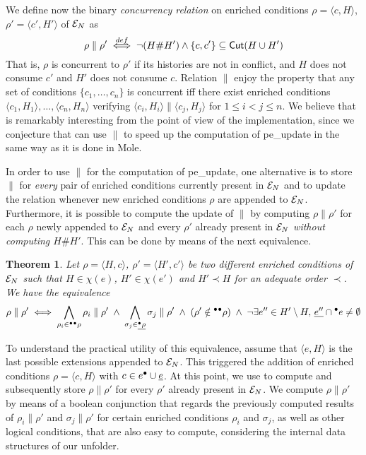 \documentclass[11pt,a4paper]{article}
\newtheorem{theorem}{Theorem}
\newcommand{\confl}{\ensuremath{\mathord{\#}}}
\newcommand{\peupdate}{\mbox{\sf pe\_update}}
\begin{document}
We define now the binary \emph{concurrency relation} on enriched conditions
$\rho = \langle c, H \rangle$, $\rho' = \langle c', H' \rangle$ of $\mathcal{E}_{N}$ as
$$ \rho \parallel \rho' \bydef\iff \lnot (H \confl H') \land \{c, c'\}
\subseteq \cut{H \cup H'}$$  That is, $\rho$ is concurrent to $\rho'$ if its
histories are not in conflict, and $H$ does not consume $c'$ and $H'$ does not
consume $c$.  Relation $\parallel$ enjoy the property that any set of
conditions $\{c_1, \ldots, c_n\}$ is concurrent iff there exist enriched
conditions $\langle c_1, H_1 \rangle, \ldots, \langle c_n, H_n \rangle$
verifying $\langle c_i, H_i \rangle \parallel \langle c_j, H_j \rangle$ for $1
\le i < j \le n$.  We believe that is remarkably interesting from the point of
view of the implementation, since we conjecture that can use $\parallel$ to
speed up the computation of \peupdate{} in the same way as it is done in Mole.

In order to use $\parallel$ for the computation of \peupdate{}, one alternative
is to store $\parallel$ for \emph{every} pair of enriched conditions currently
present in $\mathcal{E}_{N}$ and to update the relation whenever new enriched conditions
$\rho$ are appended to $\mathcal{E}_{N}$.  Furthermore, it is possible to compute the
update of $\parallel$ by computing $\rho \parallel \rho'$ for each $\rho$ newly
appended to $\mathcal{E}_{N}$ and every $\rho'$ already present in $\mathcal{E}_{N}$
\emph{without computing $H \confl H'$}. This can be done by means of the next
equivalence.

\begin{theorem}
\label{thm:two.different}
Let $\rho = \langle H, c \rangle$, $\rho' = \langle H', c' \rangle$ be two
different enriched conditions of $\mathcal{E}_{N}$ such that $H \in \chi(e)$, $H' \in
\chi(e')$ and $H' \prec H$ for an adequate order $\prec$.  We have the
equivalence $$\rho \parallel \rho' \iff \bigwedge_{\rho_i \in {}^\bullet{}^\bullet\rho}
\rho_i \parallel \rho' \; \land \; \bigwedge_{\sigma_j \in \underline{{}^\bullet\rho}}
\sigma_j \parallel \rho' \; \land \; (\rho' \notin {}^\bullet{}^\bullet\rho) \; \land \;
\lnot \exists e'' \in H' \setminus H,\, \underline{e''} \cap {}^\bullet e \not=
\emptyset$$
\end{theorem}

To understand the practical utility of this equivalence, assume that $\langle
e, H \rangle$ is the last possible extensions appended to $\mathcal{E}_{N}$.  This
triggered the addition of enriched conditions $\rho = \langle c, H \rangle$
with $c \in e^\bullet \cup \underline{e}$.  At this point, we use 
to compute and subsequently store $\rho \parallel \rho'$ for every $\rho'$
already present in $\mathcal{E}_{N}$.  We compute $\rho \parallel \rho'$ by means of a
boolean conjunction that regards the previously computed results of $\rho_i
\parallel \rho'$ and $\sigma_j \parallel \rho'$ for certain enriched conditions
$\rho_i$ and $\sigma_j$, as well as other logical conditions, that are also
easy to compute, considering the internal data structures of our unfolder.
\end{document}
